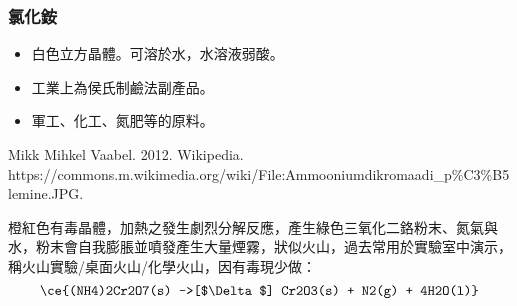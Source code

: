 \documentclass[a4paper,12pt]{report}
\begin{document}
\subsubsection{氯化銨}
\begin{itemize}
\item 白色立方晶體。可溶於水，水溶液弱酸。
\item 工業上為侯氏制鹼法副產品。
\item 軍工、化工、氮肥等的原料。
\end{itemize}
\bct\bfH\ctr{}\caption{Mikk Mihkel Vaabel. 2012. Wikipedia. https://commons.m.wikimedia.org/wiki/File:Ammooniumdikromaadi\_p\%C3\%B5lemine.JPG.}\ef\FB\ect
橙紅色有毒晶體，加熱之發生劇烈分解反應，產生綠色三氧化二鉻粉末、氮氣與水，粉末會自我膨脹並噴發產生大量煙霧，狀似火山，過去常用於實驗室中演示，稱火山實驗/桌面火山/化學火山，因有毒現少做：
\[\ce{(NH4)2Cr2O7(s) ->[$\Delta$] Cr2O3(s) + N2(g) + 4H2O(l)}\]
\end{document}
